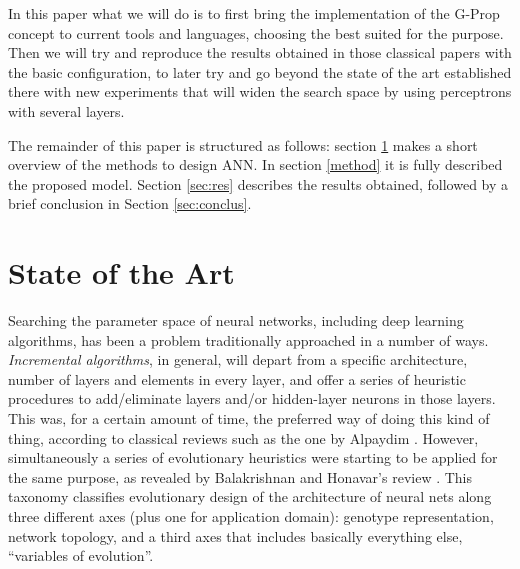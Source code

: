 \documentclass[runningheads]{llncs}
\begin{document}
In this paper what we will do is to first bring the implementation of
the G-Prop concept to current tools and languages, choosing the best
suited for the purpose. Then we will try and reproduce the results
obtained in those classical papers with the basic configuration, to
later try and go beyond the state of the art established there with
new experiments that will widen the search space by using perceptrons
with several layers.

The remainder of this paper is structured as follows:
section \ref{soa} makes a short overview of the methods to design ANN.
In section \ref{method} it is fully described the proposed model.
Section \ref{sec:res} describes the results obtained,
followed by a brief conclusion in Section \ref{sec:conclus}.

\section{State of the Art}
\label{soa}

Searching the parameter space of neural networks, including deep
learning algorithms, has been a problem traditionally approached
in a number of ways. {\em Incremental algorithms}, in
general, will depart from a specific architecture, number of layers
and elements in every layer, and offer a series of heuristic
procedures to add/eliminate layers and/or hidden-layer neurons in
those layers. This was, for a certain amount of time, the preferred
way of doing this kind of thing, according to classical reviews such
as the one by Alpaydim \cite{Alpaydim}. However, simultaneously a
series of evolutionary heuristics were starting to be applied for the
same purpose, as revealed by Balakrishnan and Honavar's review
\cite{balakrishnan95:EDNA}. This taxonomy classifies evolutionary
design of the architecture of neural nets along three different axes
(plus one for application domain): genotype representation, network
topology, and a third axes that includes basically everything else,
``variables of evolution''.
\end{document}
